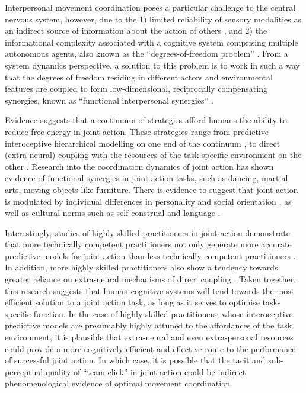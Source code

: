 \begin{CJK}{UTF8}{gbsn}
Interpersonal movement coordination poses a particular challenge to the central nervous system, however, due to the 1) limited reliability of sensory modalities as an indirect source of information about the action of others \citep{Frith2007}, and 2) the informational complexity associated with a cognitive system comprising multiple autonomous agents, also known as the ``degrees-of-freedom problem'' \citep[see ][]{Bernstein1967,Turvey1982,Turvey1990}.  From a system dynamics perspective, a solution to this problem is to work in such a way that the degrees of freedom residing in different actors and environmental features are coupled to form low-dimensional, reciprocally compensating synergies, known as ``functional interpersonal synergies'' \citep{Riley2011}.

Evidence suggests that a continuum of strategies afford humans the ability to reduce free energy in joint action.  These strategies range
from predictive interoceptive hierarchical modelling on one end of the continuum \citep{Pesquita2017}, to direct (extra-neural) coupling with the resources of the task-specific environment on the other \citep{Riley2011}. Research into the coordination dynamics of joint action has shown evidence of functional synergies in joint action tasks, such as dancing, martial arts, moving objects like furniture.
There is evidence to suggest that joint action is modulated by individual differences in personality and social orientation \citep{Marsh2009,Keller2014}, as well as cultural norms such as self construal \citep{Colzato2012} and language \citep{Boroditsky2010}.

Interestingly, studies of highly skilled practitioners in joint action demonstrate that more technically competent practitioners not only generate more accurate predictive models for joint action than less technically competent practitioners \citep{Tomeo2012,Aglioti2008,Mulligan2016}.  In addition, more highly skilled practitioners also show a tendency towards greater reliance on extra-neural mechanisms of direct coupling \citep{Schmidt2011,Bourbousson2012,RKiouak2016,Caron2017}.  Taken together, this research suggests that human cognitive systems will tend towards the most efficient solution to a joint action task, as long as it serves to optimise task-specific function.  In the case of highly skilled practitioners, whose interoceptive predictive models are presumably highly attuned to the affordances of the task environment, it is plausible that extra-neural and even extra-personal resources could provide a more cognitively efficient and effective route to the performance of successful joint action.  In which case, it is possible that the tacit and sub-perceptual quality of ``team click'' in joint action could be indirect phenomenological evidence of optimal movement coordination.


\end{CJK}
